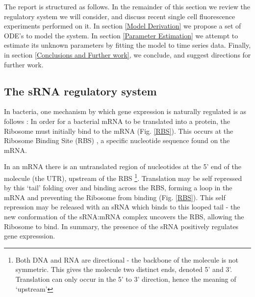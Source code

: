 \documentclass[10pt,journal]{./IEEE_latex_class/IEEEtran}
\begin{document}
The report is structured as follows. In the remainder of this section we review the regulatory system we will consider, and discuss recent single cell fluorescence experiments performed on it. In section \ref{Model Derivation} we propose a set of ODE's to model the system. In section \ref{Parameter Estimation} we attempt to estimate its unknown parameters by fitting the model to time series data. Finally, in section \ref{Conclusions and Further work}, we conclude, and suggest directions for further work.




\subsection{The sRNA regulatory system}
\label{The sRNA regulatory system}
In bacteria, one mechanism by which gene expression is naturally regulated is as follows \cite{Soper2010}: In order for a bacterial mRNA to be translated into a protein, the Ribosome must initially bind to the mRNA (Fig. \ref{RBS}). This occurs at the Ribosome Binding Site (RBS) \cite{Shine1974}, a specific nucleotide sequence found on the mRNA. 

In an mRNA there is an untranslated region of nucleotides at the 5' end of the molecule (the UTR), upstream of the RBS \footnote{Both DNA and RNA are directional - the backbone of the molecule is not symmetric. This gives the molecule two distinct ends, denoted 5' and 3'. Translation can only occur in the 5' to 3' direction, hence the meaning of `upstream'}. Translation may be self repressed by this `tail' folding over and binding across the RBS, forming a  loop in the mRNA and preventing the Ribosome from binding (Fig. \ref{RBS}). This self repression may be released with an sRNA which binds to this looped tail - the new conformation of the sRNA:mRNA complex uncovers the RBS, allowing the Ribosome to bind. In summary, the presence of the sRNA positively regulates gene expresssion.
\end{document}
